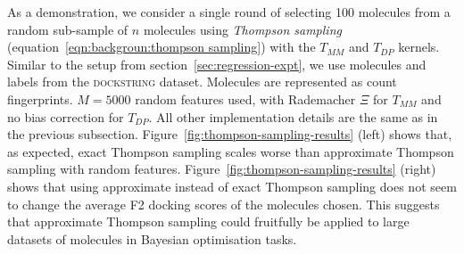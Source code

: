 As a demonstration, we consider a single round of selecting 100 molecules from a random sub-sample of $n$ molecules using \emph{Thompson sampling}
(equation~\ref{eqn:backgroun:thompson sampling}) with the $T_{MM}$ and $T_{DP}$ kernels.
Similar to the setup from section~\ref{sec:regression-expt},
we use molecules and labels from the \textsc{dockstring} dataset.
Molecules are represented as count fingerprints.
$M=5000$ random features used, with Rademacher $\Xi$ for $T_{MM}$ and no bias correction for $T_{DP}$.
All other implementation details are the same as in the previous subsection.
Figure~\ref{fig:thompson-sampling-results} (left) shows that,
as expected, exact Thompson sampling scales worse than
approximate Thompson sampling with random features.
Figure~\ref{fig:thompson-sampling-results} (right) shows that using approximate instead of exact Thompson sampling does not seem to change the average F2 docking scores of the molecules chosen.
This suggests that approximate Thompson sampling could fruitfully be applied to large datasets of molecules
in Bayesian optimisation tasks.
